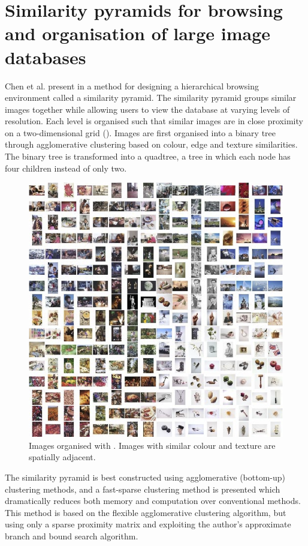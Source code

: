\section{Similarity pyramids for browsing and organisation of large image databases} %
\label{sub:Chen}

Chen et al. present in \cite{Chen:1998p2344} a method for designing a hierarchical browsing environment called a similarity pyramid. The similarity pyramid groups similar images together while allowing users to view the database at varying levels of resolution. Each level is organised such that similar images are in close proximity on a two-dimensional grid (). Images are first organised into a binary tree through agglomerative clustering based on colour, edge and texture similarities. The binary tree is transformed into a quadtree, a tree in which each node has four children instead of only two.

\begin{figure}[ht]
	\centering
		\includegraphics[scale=0.8]{imgs-RelatedWork/Chen-1998p2344.png}
	\caption{Images organised with \cite{Chen:1998p2344}. Images with similar colour and texture are spatially adjacent.}
	\label{fig:Chen1}
\end{figure}

The similarity pyramid is best constructed using agglomerative (bottom-up) clustering methods, and a fast-sparse clustering method is presented which dramatically reduces both memory and computation over conventional methods. This method is based on the flexible agglomerative clustering algorithm, but using only a sparse proximity matrix and exploiting the author's approximate branch and bound search algorithm.

